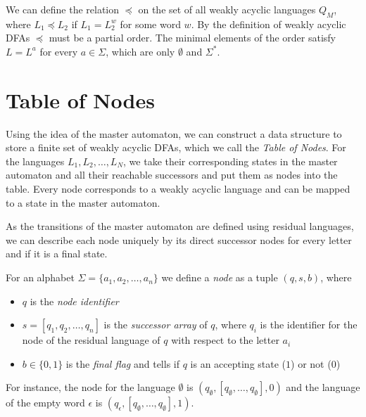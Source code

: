 \par

We can define the relation $\preceq$ on the set of all weakly acyclic languages $Q_{M}$, where $L_{1} \preceq L_{2}$ if $L_{1} = L_{2}^{w}$ for some word $w$. By the definition of weakly acyclic DFAs $\preceq$ must be a partial order. The minimal elements of the order satisfy $L = L^{a}$ for every $a \in \Sigma$, which are only $\emptyset$ and $\Sigma^{*}$.



\section{Table of Nodes}
Using the idea of the master automaton, we can construct a data structure to store a finite set of weakly acyclic DFAs, which we call the \textit{Table of Nodes}. For the languages $L_{1},L_{2},\dots,L_{N}$, we take their corresponding states in the master automaton and all their reachable successors and put them as nodes into the table. Every node corresponds to a weakly acyclic language and can be mapped to a state in the master automaton.

\par 

As the transitions of the master automaton are defined using residual languages, we can describe each node uniquely by its direct successor nodes for every letter and if it is a final state.

\par

For an alphabet $\Sigma = \{a_{1}, a_{2},\dots,a_{n} \}$ we define a \emph{node} as a tuple $(q,s,b)$, where
\begin{itemize}[--,noitemsep]
\item $q$ is the \emph{node identifier}
\item $s = [q_{1},q_{2},\dots,q_{n}]$ is the \emph{successor array} of $q$, where $q_{i}$ is the identifier for the node of the residual language of $q$ with respect to the letter $a_{i}$
\item $b \in \{0,1\}$ is the \emph{final flag} and tells if $q$ is an accepting state ($1$) or not ($0$)
\end{itemize}
For instance, the node for the language $\emptyset$ is $(q_{\emptyset},[q_{\emptyset},\dots,q_{\emptyset}],0)$ and the language of the empty word $\epsilon$ is $(q_{\epsilon},[q_{\emptyset},\dots,q_{\emptyset}],1)$.

